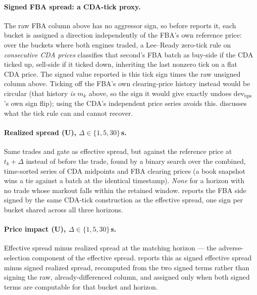 \paragraph{Signed FBA spread: a CDA-tick proxy.} The raw FBA column above
has no aggressor sign, so before  reports it, each bucket
is assigned a direction independently of the FBA's own reference price:
over the buckets where both engines traded, a Lee--Ready zero-tick rule
\citep{leeready1991} on \emph{consecutive CDA prices} classifies that
second's FBA batch as buy-side if the CDA ticked up, sell-side if it
ticked down, inheriting the last nonzero tick on a flat CDA price. The
signed value reported is this tick sign times the raw unsigned column
above. Ticking off the FBA's own clearing-price history instead would be
circular (that history \emph{is} $m_k$ above, so the sign it would give
exactly undoes $\mathrm{dev}_{\mathrm{bps}}$'s own sign flip); using the
CDA's independent price series avoids this.  discusses
what the tick rule can and cannot recover.

\paragraph{Realized spread (U), $\Delta \in \{1,5,30\}$\,s.} Same trades
and gate as effective spread, but against the reference price at
$t_k+\Delta$ instead of before the trade, found by a binary search over
the combined, time-sorted series of CDA midpoints and FBA clearing
prices (a book snapshot wins a tie against a batch at the identical
timestamp). \emph{None} for a horizon with no trade whose markout falls
within the retained window.  reports the FBA side signed
by the same CDA-tick construction as the effective spread, one sign per
bucket shared across all three horizons.

\paragraph{Price impact (U), $\Delta \in \{1,5,30\}$\,s.} Effective
spread minus realized spread at the matching horizon --- the
adverse-selection component of the effective spread. 
reports this as signed effective spread minus signed realized spread,
recomputed from the two signed terms rather than signing the raw,
already-differenced column, and assigned only when both signed terms are
computable for that bucket and horizon.

